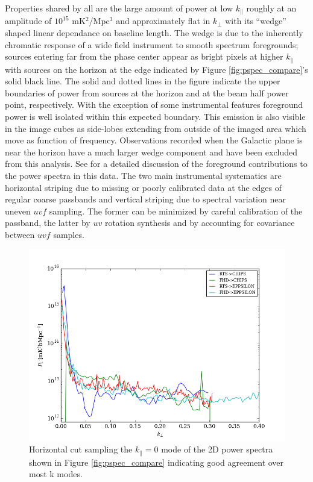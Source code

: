 \documentclass[preprint2]{aastex}
\begin{document}
Properties shared by all are the large amount of power at low $k_{\parallel}$ roughly at an amplitude of $10^{15}$ mK$^2$/Mpc$^3$ and approximately flat in $k_{\perp}$ with its ``wedge'' shaped linear dependance on baseline length.  The wedge is due to the inherently chromatic response of a wide field instrument to smooth spectrum foregrounds; sources entering far from the phase center appear as bright pixels at higher $k_\parallel$ with sources on the horizon at the edge indicated by Figure \ref{fig:pspec_compare}'s  solid black line. The solid and dotted lines in the figure indicate the upper boundaries of power from sources at the horizon and at the beam half power point, respectively.  With the exception of some instrumental features foreground power is well isolated within this expected boundary. This emission is also visible in the image cubes as side-lobes extending from outside of the imaged area which move as function of frequency.  Observations recorded when the Galactic plane is near the horizon have a much larger wedge component and have been excluded from this analysis. See \citet{2015arXiv150207596T} for a detailed discussion of the foreground contributions to the power spectra in this data.
The two main instrumental systematics are horizontal striping due to missing or poorly calibrated data at the edges of regular coarse passbands and vertical striping due to spectral variation near uneven $uvf$ sampling. The former can be minimized by careful calibration of the passband, the latter by $uv$ rotation synthesis and by accounting for covariance between $uvf$ samples. 
\begin{figure}[htbp]
\begin{center}
\includegraphics[width=\textwidth]{figures/MWAPipeline_compare_1d_kperp}
\caption{Horizontal cut sampling the $k_\parallel = 0$ mode of the 2D power spectra shown in Figure \ref{fig:pspec_compare} indicating good agreement over most k modes.}
\label{fig:1d_kperp}
\end{center}
\end{figure}
\end{document}
